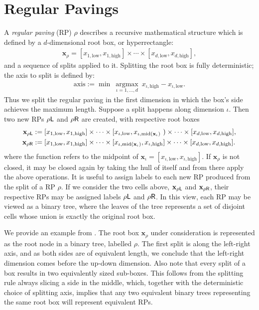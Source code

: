 \documentclass{report}
\begin{document}
\section{Regular Pavings}
A \textit{regular paving} (RP) $\rho$ describes a recursive mathematical structure which is defined by a $d$-dimensional root box, or hyperrectangle:
\begin{align*}
	\mathbf{x}_{\rho} = [x_{1,\text{low}}, x_{1,\text{high}}] \times \cdots \times [x_{d,\text{low}}, x_{d,\text{high}}],
\end{align*}
and a sequence of splits applied to it. Splitting the root box is fully deterministic; the axis to split is defined by:
\begin{align*}
	\text{axis} := \min \ \underset{\iota = 1,\dots,d}{\operatorname{argmax}} \  x_{\iota,\text{high}} - x_{\iota,\text{low}}.
\end{align*}
Thus we split the regular paving in the first dimension in which the box's side achieves the maximum length. Suppose a split happens along dimension $\iota$. Then two new RPs $\rho\sf{L}$ and $\rho\sf{R}$ are created,
with respective root boxes
\begin{align*}
	\mathbf{x}_{\rho\sf{L}} &:= [x_{1,\text{low}}, x_{1,\text{high}}] \times \cdots \times [x_{\iota,\text{low}}, x_{\iota,\text{mid}(\mathbf{x}_\iota)}\ ) \times \cdots \times [x_{d,\text{low}}, x_{d,\text{high}}], \\
	\mathbf{x}_{\rho\sf{R}} &:= [x_{1,\text{low}}, x_{1,\text{high}}] \times \cdots \times [x_{\iota,\text{mid}(\mathbf{x}_\iota)}, x_{\iota,\text{high}}] \times \cdots \times [x_{d,\text{low}}, x_{d,\text{high}}].
\end{align*}
where the function  refers to the midpoint of $\mathbf{x}_\iota = [x_{\iota,\text{low}}, x_{\iota,\text{high}}]$. If $\mathbf{x}_\rho$ is not closed, it may be closed again by taking the hull
of itself and from there apply the above operations.  It is useful to assign labels to each new RP
produced from the split of a RP $\rho$. If we consider the two cells above, $\mathbf{x}_{\rho \sf{L}}$ and $\mathbf{x}_{\rho \sf{R}}$, their respective 
RPs may be assigned labels $\rho \sf{L}$ and $\rho \sf{R}$. In this view, each RP may be viewed as a binary tree, where the leaves of the tree represents a set of disjoint cells whose union is exactly the original root box. 

We provide an example from \cite{Mapped Regular Pavings}. The root box $\mathbf{x}_\rho$ under consideration is represented as the root node in a binary tree, labelled $\rho$. The first split is along the left-right
axis, and as both sides are of equivalent length, we conclude that the left-right dimension comes before the up-down dimension. Also note that every split of a box results in two equivalently sized sub-boxes.
This follows from the splitting rule always slicing a side in the middle, which, together with the deterministic choice of splitting axis, implies that any two equivalent binary trees representing the same root box will
represent equivalent RPs.
\end{document}
